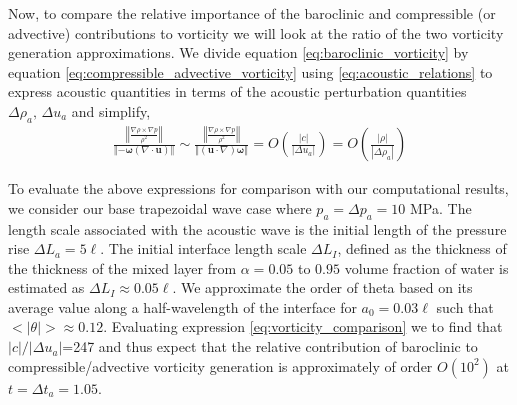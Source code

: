 \documentclass{jfm}%
\newcommand{\orderof}[1]{\ensuremath{\textit{O}\left(#1\right)}}
\newcommand{\abs}[1]{\ensuremath{\left|#1\right|}}
\newcommand{\norm}[1]{\ensuremath{\left\Vert#1\right\Vert}}
\begin{document}
Now, to compare the relative importance of the baroclinic and
compressible (or advective) contributions to vorticity we will look at
the ratio of the two vorticity generation approximations. We divide
equation \eqref{eq:baroclinic_vorticity} by equation
\eqref{eq:compressible_advective_vorticity} using
\eqref{eq:acoustic_relations} to express acoustic quantities in terms
of the acoustic perturbation quantities $\Delta \rho_a,\,\Delta u_a$ and simplify,
\begin{align} \label{eq:vorticity_comparison}
  \frac{\norm{\frac{\nabla\rho\times\nabla
  p}{\rho^2}}}{\norm{-\boldsymbol{\omega}\left(\nabla\cdot\boldsymbol{u}\right)}}
  \sim
  \frac{\norm{\frac{\nabla\rho\times\nabla
  p}{\rho^2}}}{\norm{\left(\boldsymbol{u}\cdot\nabla\right)\boldsymbol{\omega}}}
  = \orderof{\frac{\abs{c}}{\abs{\Delta u_a}}} = \orderof{\frac{\abs{\rho}}{\abs{\Delta \rho_a}}}%
\end{align}

To evaluate the above expressions for comparison with our
computational results, we consider our base trapezoidal wave case
where $p_a = \Delta p_a = 10$ MPa. The length scale associated with
the acoustic wave is the initial length of the pressure rise
$\Delta L_a=5\ell$. The initial interface length scale
$\Delta L_I$, defined as the thickness of the thickness of the mixed
layer from $\alpha=0.05$ to $0.95$ volume fraction of water is estimated
as $\Delta L_I \approx 0.05\ell$. We approximate the order of theta
based on its average value along a half-wavelength of the interface
for $a_0=0.03\ell$ such that
$<\abs{\theta}>\approx0.12$. Evaluating expression
\eqref{eq:vorticity_comparison} we to find that
$\abs{c}/\abs{\Delta u_a}$=247 and thus expect that the relative
contribution of baroclinic to compressible/advective vorticity
generation is approximately of order $\orderof{10^2}$ at
$t=\Delta t_a=1.05$.
\end{document}
